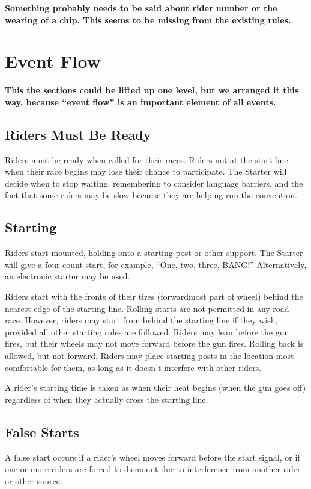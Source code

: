 \textbf{Something probably needs to be said about rider number or the wearing of a chip.  This seems to be missing from the existing rules.}

\section{Event Flow}

\textbf{This the sections could be lifted up one level, but we arranged it this way, because ``event flow'' is an important element of all events.}

\subsection{Riders Must Be Ready}
Riders must be ready when called for their races.
Riders not at the start line when their race begins may lose their chance to participate.
The Starter will decide when to stop waiting, remembering to consider language barriers, and the fact that some riders may be slow because they are helping run the convention.

\subsection{Starting}
Riders start mounted, holding onto a starting post or other support.
The Starter will give a four-count start, for example, ``One, two, three, BANG!'' Alternatively, an electronic starter may be used.

Riders start with the fronts of their tires (forwardmost part of wheel) behind the nearest edge of the starting line.
Rolling starts are not permitted in any road race.
However, riders may start from behind the starting line if they wish, provided all other starting rules are followed.
Riders may lean before the gun fires, but their wheels may not move forward before the gun fires.
Rolling back is allowed, but not forward.
Riders may place starting posts in the location most comfortable for them, as long as it doesn't interfere with other riders.

A rider's starting time is taken as when their heat begins (when the gun goes off) regardless of when they actually cross the starting line.

\subsection{False Starts}
A false start occurs if a rider's wheel moves forward before the start signal, or if one or more riders are forced to dismount due to interference from another rider or other source.

